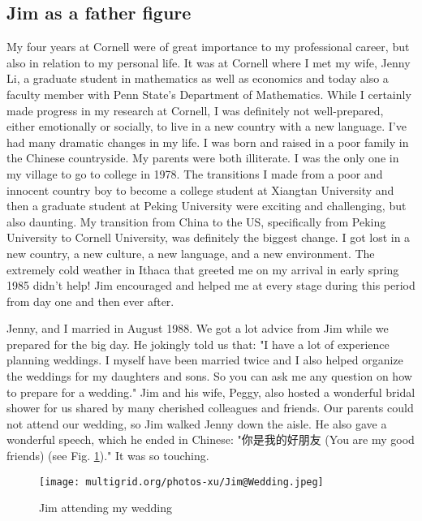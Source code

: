 \documentclass[CJK,11pt]{amsart}
\theoremstyle{definition}
\begin{document}
\begin{CJK*}{UTF8}{gbsn}
\section{Jim as a father figure}
My four years at Cornell were of great importance to my professional career, but also in relation to my personal life. It was at Cornell where I met my wife, Jenny Li, a graduate student in mathematics as well as economics and today also a faculty member with Penn State's Department of Mathematics.
While I certainly made progress in my research at Cornell, I was definitely not well-prepared, either emotionally or socially, to live in a new country with a new language. I've had many dramatic changes in my life. I was born and raised in a poor family in the Chinese countryside. My parents were both illiterate. I was the only one in my village to go to college in 1978. The transitions I made from a poor and innocent country boy to become a college student at Xiangtan University and then a graduate student at Peking University were exciting and challenging, but also daunting. My transition from China to the US, specifically from Peking University to Cornell University, was definitely the biggest change. I got lost in a new country, a new culture, a new language, and a new environment. The extremely cold weather in Ithaca that greeted me on my arrival in early spring 1985 didn't help! Jim encouraged and helped me at every stage during this period from day one and then ever after. 

Jenny, and I married in August 1988. We got a lot advice from Jim while we prepared for the big day. He jokingly told us that: "I have a lot of experience planning weddings. I myself have been married twice and I also helped organize the weddings for my daughters and sons. So you can ask me any question on how to prepare for a wedding."
Jim and his wife, Peggy, also hosted a wonderful bridal shower for us shared by many cherished colleagues and friends. Our parents could not attend our wedding, so Jim walked Jenny down the aisle. He also gave a wonderful speech, which he ended in Chinese: "你是我的好朋友 (You are my good friends) (see Fig. \ref{FigW})."  It was so touching.
\begin{figure}[h]
 \texttt{[image: multigrid.org/photos-xu/Jim@Wedding.jpeg]}
 \caption{\tiny Jim attending my wedding}
 \label{FigW}
\end{figure}


\end{CJK*}
\end{document}
